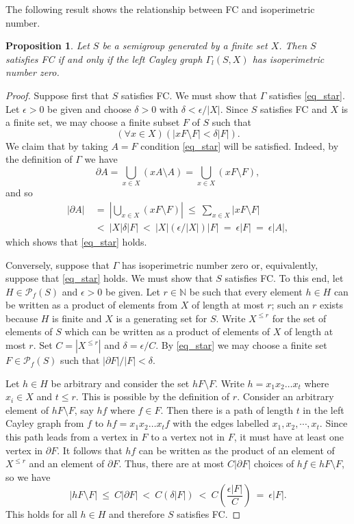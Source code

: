 \documentclass[11pt,a4paper,reqno]{amsart}
\newtheorem{proposition}[theorem]{Proposition}
\begin{document}
The following result shows the relationship between FC and isoperimetric number. 
\begin{proposition}\label{prop_isop}
Let $S$ be a semigroup generated by a finite set $X$. Then $S$ satisfies
FC if and only if the left Cayley graph
$\Gamma_l(S,X)$ has isoperimetric number zero. 
\end{proposition}
\begin{proof}
Suppose first that $S$ satisfies FC.
We must show that $\Gamma$ satisfies \eqref{eq_star}. Let $\epsilon > 0$
be given and choose  $\delta > 0$ with $\delta < \epsilon / |X|$. Since $S$
satisfies FC and $X$ is a finite set, we may choose a finite subset $F$
of $S$ such that
\[
(\forall x \in X)(|xF \setminus F| < \delta |F|).
\] 
We claim that by taking $A = F$  condition \eqref{eq_star} will be satisfied.
Indeed, by the definition of $\Gamma$ we have 
\[
\partial A = \bigcup_{x \in X} (xA \setminus A) =  \bigcup_{x \in X} (xF \setminus F),
\]
and so
\begin{align*}
|\partial A|
\ & = \ \left| \bigcup_{x \in X} (xF \setminus F) \right| \ \leq \ \sum_{x \in X} |xF \setminus F| \\
& < \ |X| \delta|F| \ < \ |X| (\epsilon / |X|) |F| \ = \ \epsilon |F| \ = \ \epsilon |A|, 
\end{align*}
which shows that \eqref{eq_star} holds. 

Conversely, suppose that $\Gamma$ has isoperimetric number zero or,
equivalently, suppose that \eqref{eq_star} holds. We must show that $S$
satisfies FC.
To this end, let $H \in \mathcal{P}_f(S)$ and $\epsilon > 0$ be given. Let
$r \in \mathbb{N}$ be such that every element $h \in H$ can be
written as a product of elements from $X$ of length at most $r$; such
an $r$ exists because $H$ is finite and $X$ is a generating set for
$S$. Write $X^{\leq r}$ for the set of elements of $S$ which can be
written as a product of elements of $X$ of length at most $r$. Set
$C = |X^{\leq r}|$ and $\delta = \epsilon / C$.
By \eqref{eq_star} we may choose a finite set $F \in \mathcal{P}_f(S)$
such that $|\partial F| / |F| < \delta$.

Let $h \in H$ be arbitrary and consider the set $hF \setminus F$. Write
$h = x_1 x_2 \ldots x_t$ where $x_i \in X$ and $t \leq r$. This is
possible by the definition of $r$. Consider an arbitrary element of
$hF \setminus F$, say $hf$ where $f \in F$. Then there is a path of
length $t$ in the
left Cayley graph from $f$ to $hf = x_1 x_2 \ldots x_t f$ with the edges
labelled $x_1, x_2, \cdots, x_t$. Since this path leads from a vertex
in $F$ to a vertex not in $F$, it must have at least one vertex in
$\partial F$. It follows that $hf$ can be written
as the product of an element of $X^{\leq r}$ and an element of $\partial F$.
Thus, there are at most $C |\partial F|$ choices of $hf \in hF \setminus F$,
so we have
\[
|hF \setminus F|
\ \leq \ C |\partial F|
\ < \ C \left( \delta |F| \right)
\ < \ C \left( \frac{\epsilon |F| }{C} \right)
\ = \ \epsilon |F|. 
\]
This holds for all $h \in H$ and therefore $S$ satisfies FC. 
\end{proof}
\end{document}
